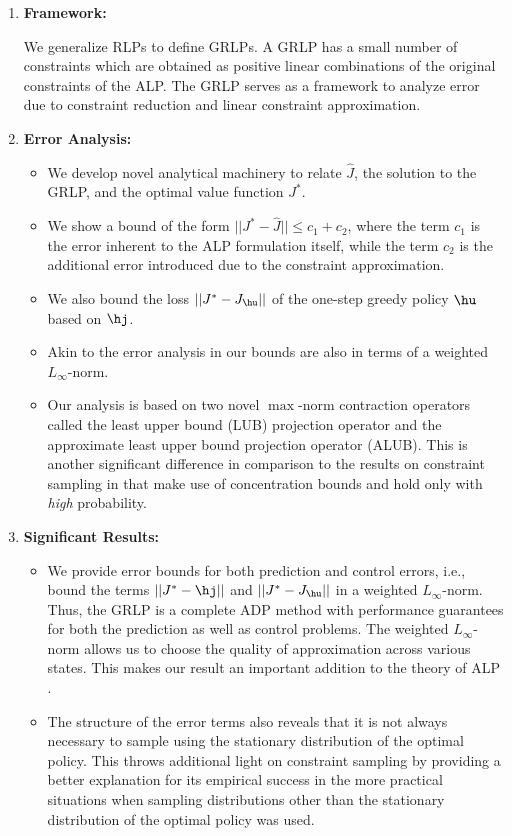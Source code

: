 \begin{enumerate}
\item \textbf{Framework:}

We generalize RLPs to define GRLPs. A GRLP has a small number of constraints which are obtained as positive linear combinations of the original constraints of the ALP. 
The GRLP serves as a framework to analyze error due to constraint reduction and linear constraint approximation.
\item \textbf{Error Analysis:}
	\begin{itemize}
		\item We develop novel analytical machinery to relate $\hat{J}$, the solution to the GRLP, and the optimal value function $J^*$. 
		\item We show a bound of the form $||J^*-\hat{J}||\leq c_1+c_2$, 
		where the term $c_1$ is the error inherent to the ALP formulation itself, 
		while the term $c_2$ is the additional error introduced due to the constraint approximation.  
		\item We also bound the loss $||J^*-J_{\hu}||$ of the one-step greedy policy $\hu$ based on $\hj$.
		\item Akin to the error analysis in \cite{ALP,CS,SALP} our bounds are also in terms of a weighted $L_\infty$-norm.
		\item Our analysis is based on two novel $\max$-norm contraction operators called the least upper bound (LUB) projection operator and the approximate least upper bound projection operator (ALUB). This is another significant difference in comparison to the results on constraint sampling in \cite{SALP,CS} that make use of concentration bounds and hold only with \emph{high} probability.
\end{itemize}
\item \textbf{Significant Results:}
	\begin{itemize}
		\item We provide error bounds for both prediction and control errors, i.e., bound the terms $||J^*-\hj||$ and $||J^*-J_{\hu}||$ in a weighted $L_\infty$-norm. Thus, the GRLP is a complete ADP method with performance guarantees for both the prediction as well as control problems. The weighted $L_\infty$-norm allows us to choose the quality of approximation across various states. This makes our result an important addition to the theory of ALP \cite{ALP,CS,CST,SALP}.
		\item The structure of the error terms also reveals that it is not always necessary to sample using the stationary distribution of the optimal policy. This throws additional light on constraint sampling by providing a better explanation for its empirical success in the more practical situations when sampling distributions other than the stationary distribution of the optimal policy was used. 

\end{itemize}
\end{enumerate}
